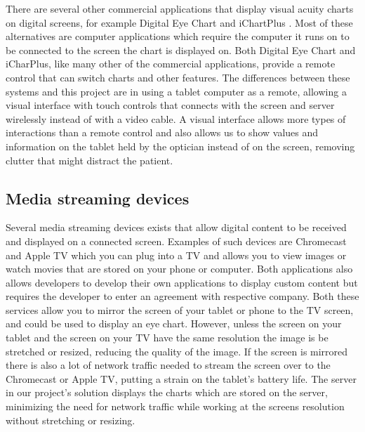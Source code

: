 \documentclass[12pt,a4paper,notitlepage]{report}
\begin{document}
There are several other commercial applications that display visual acuity charts on digital screens, for example Digital Eye Chart \cite{digitaleyechart} and iChartPlus \cite{ichartplus}. Most of these alternatives are computer applications which require the computer it runs on to be connected to the screen the chart is displayed on. Both Digital Eye Chart and iCharPlus, like many other of the commercial applications, provide a remote control that can switch charts and other features. The differences between these systems and this project are in using a tablet computer as a remote, allowing a visual interface with touch controls that connects with the screen and server wirelessly instead of with a video cable. A visual interface allows more types of interactions than a remote control and also allows us to show values and information on the tablet held by the optician instead of on the screen, removing clutter that might distract the patient.

\subsection{Media streaming devices}
Several media streaming devices exists that allow digital content to be received and displayed on a connected screen. Examples of such devices are Chromecast \cite{chromecast} and Apple TV \cite{appletv} which you can plug into a TV and allows you to view images or watch movies that are stored on your phone or computer. Both applications also allows developers to develop their own applications to display custom content but requires the developer to enter an agreement with respective company. Both these services allow you to mirror the screen of your tablet or phone to the TV screen, and could be used to display an eye chart. However, unless the screen on your tablet and the screen on your TV have the same resolution the image is be stretched or resized, reducing the quality of the image. If the screen is mirrored there is also a lot of network traffic needed to stream the screen over to the Chromecast or Apple TV, putting a strain on the tablet's battery life. The server in our project's solution displays the charts which are stored  on the server, minimizing the need for network traffic while working at the screens resolution without stretching or resizing.
\end{document}

